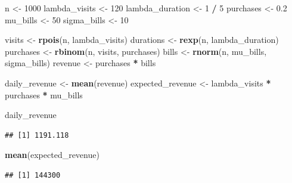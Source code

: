 \documentclass[
]{article}
\newenvironment{Shaded}{\begin{snugshade}}{\end{snugshade}}
\newcommand{\DecValTok}[1]{\textcolor[rgb]{0.00,0.00,0.81}{#1}}
\newcommand{\FloatTok}[1]{\textcolor[rgb]{0.00,0.00,0.81}{#1}}
\newcommand{\KeywordTok}[1]{\textcolor[rgb]{0.13,0.29,0.53}{\textbf{#1}}}
\newcommand{\NormalTok}[1]{#1}
\newcommand{\OperatorTok}[1]{\textcolor[rgb]{0.81,0.36,0.00}{\textbf{#1}}}
\newcommand{\StringTok}[1]{\textcolor[rgb]{0.31,0.60,0.02}{#1}}
\begin{document}
\begin{Shaded}
\begin{Highlighting}[]
\NormalTok{n \textless{}{-}}\StringTok{ }\DecValTok{1000}
\NormalTok{lambda\_visits \textless{}{-}}\StringTok{ }\DecValTok{120}
\NormalTok{lambda\_duration \textless{}{-}}\StringTok{ }\DecValTok{1} \OperatorTok{/}\StringTok{ }\DecValTok{5}
\NormalTok{purchases \textless{}{-}}\StringTok{ }\FloatTok{0.2}
\NormalTok{mu\_bills \textless{}{-}}\StringTok{ }\DecValTok{50}
\NormalTok{sigma\_bills \textless{}{-}}\StringTok{ }\DecValTok{10}

\NormalTok{visits \textless{}{-}}\StringTok{ }\KeywordTok{rpois}\NormalTok{(n, lambda\_visits)}
\NormalTok{durations \textless{}{-}}\StringTok{ }\KeywordTok{rexp}\NormalTok{(n, lambda\_duration)}
\NormalTok{purchases \textless{}{-}}\StringTok{ }\KeywordTok{rbinom}\NormalTok{(n, visits, purchases)}
\NormalTok{bills \textless{}{-}}\StringTok{ }\KeywordTok{rnorm}\NormalTok{(n, mu\_bills, sigma\_bills)}
\NormalTok{revenue \textless{}{-}}\StringTok{ }\NormalTok{purchases }\OperatorTok{*}\StringTok{ }\NormalTok{bills}

\NormalTok{daily\_revenue \textless{}{-}}\StringTok{ }\KeywordTok{mean}\NormalTok{(revenue)}
\NormalTok{expected\_revenue \textless{}{-}}\StringTok{ }\NormalTok{lambda\_visits }\OperatorTok{*}\StringTok{ }\NormalTok{purchases }\OperatorTok{*}\StringTok{ }\NormalTok{mu\_bills}

\NormalTok{daily\_revenue}
\end{Highlighting}
\end{Shaded}

\begin{verbatim}
## [1] 1191.118
\end{verbatim}

\begin{Shaded}
\begin{Highlighting}[]
\KeywordTok{mean}\NormalTok{(expected\_revenue)}
\end{Highlighting}
\end{Shaded}

\begin{verbatim}
## [1] 144300
\end{verbatim}
\end{document}
